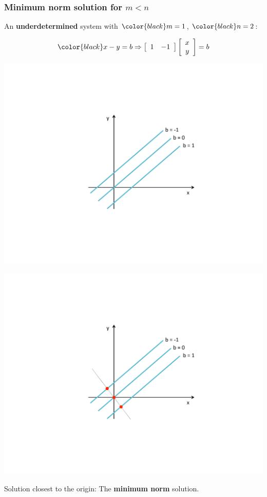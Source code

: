 \documentclass[compress]{beamer}
\newcommand{\black}[1]{{\color{black}#1}}
\renewcommand{\emph}[1]{\textbf{\black{#1}}}
\newcommand{\beq}[1]{\[\black{#1}\]}
\begin{document}
\begin{frame}[fragile]
\frametitle{Minimum norm solution for $m<n$}

An \emph{underdetermined} system with $\black{m=1}$, $\black{n=2}$:


\beq{
x - y = b \Rightarrow \left[\begin{array}{rr}
1 & -1\\
\end{array}
\right]
\left[ 
\begin{array}{c}
x\\
y
\end{array}
\right] = b
 }

\begin{overprint}
\begin{center}
\includegraphics[trim = 40mm 65mm 65mm 50mm, clip, width=.7\textwidth]{./img/min-norm-1}
\end{center}

\begin{center}
\includegraphics[trim = 40mm 65mm 65mm 50mm, clip, width=.7\textwidth]{./img/min-norm-2}
\end{center}
\vspace{.2cm}
Solution closest to the origin: The \emph{minimum norm} solution.
\end{overprint}

\end{frame}
\end{document}
